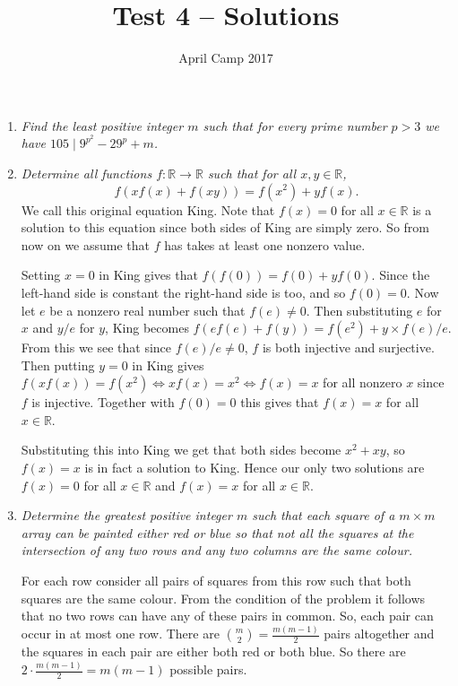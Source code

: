\documentclass[a4paper,12pt]{article}
\author{April Camp 2017}
\title{Test 4 -- Solutions}
\date{}
\begin{document}
 \maketitle

\begin{enumerate}
	\item %
	\textit{Find the least positive integer $m$ such that for every prime number $p>3$ we have $105 \mid 9^{p^2} -29^p +m$.}
	
	
	
	\item
	\textit{Determine all functions $f: \mathbb{R}\to\mathbb{R}$ such that for all $x,y\in\mathbb{R}$, $$f(xf(x)+f(xy)) = f(x^2) +yf(x).$$}
	We call this original equation King. Note that $f(x)=0$ for all $x\in\mathbb{R}$ is a solution to this equation since both sides of King are simply zero. So from now on we assume that $f$ has takes at least one nonzero value.
	
	Setting $x=0$ in King gives that $f(f(0)) = f(0)+yf(0)$. Since the left-hand side is constant the right-hand side is too, and so $f(0)=0$. Now let $e$ be a nonzero real number such that $f(e)\neq0$. Then substituting $e$ for $x$ and $y/e$ for $y$, King becomes $f(ef(e)+f(y)) = f(e^2)+y\times f(e)/e$. From this we see that since $f(e)/e\neq0$, $f$ is both injective and surjective. Then putting $y=0$ in King gives $f(xf(x)) = f(x^2) \iff xf(x)=x^2 \iff f(x)=x$ for all nonzero $x$ since $f$ is injective. Together with $f(0)=0$ this gives that $f(x)=x$ for all $x\in\mathbb{R}$.
	
	Substituting this into King we get that both sides become $x^2+xy$, so $f(x)=x$ is in fact a solution to King. Hence our only two solutions are $f(x)=0$ for all $x\in\mathbb{R}$ and $f(x)=x$ for all $x\in\mathbb{R}$.
	
	\item %
	\textit{Determine the greatest positive integer $m$ such that each square of a $m\times m$ array can be painted either red or blue so that not all the squares at the intersection of any two rows and any two columns are the same colour.}
	
	For each row consider all pairs of squares from this row such that both squares are the same colour. From the condition of the problem it follows that no two rows can have any of these pairs in common. So, each pair can occur in at most one row. There are $\binom{m}{2} = \frac{m(m-1)}{2}$ pairs altogether and the squares in each pair are either both red or both blue. So there are $2 \cdot \frac{m(m-1)}{2} = m(m - 1)$ possible pairs.
	

\end{enumerate}
\end{document}
